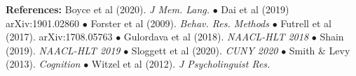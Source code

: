 \documentclass[11pt,a4paper]{article}
\begin{document}
\vspace{.1em}
	\begin{small}{
			\noindent\textbf{References:}
			Boyce et al (2020). \textit{J Mem. Lang.} $\bullet$
			Dai et al (2019) arXiv:1901.02860 $\bullet$
			Forster et al (2009). \textit{Behav. Res. Methods} $\bullet$
			Futrell et al (2017). arXiv:1708.05763 $\bullet$
			Gulordava et al (2018).  \textit{NAACL-HLT 2018} $\bullet$
			Shain (2019). \textit{NAACL-HLT 2019} $\bullet$
			Sloggett et al (2020). \textit{CUNY 2020} $\bullet$
			Smith \& Levy (2013). \textit{Cognition} $\bullet$
			Witzel et al (2012).  \textit{J Psycholinguist Res.} 
		}
	\end{small}
\end{document}
